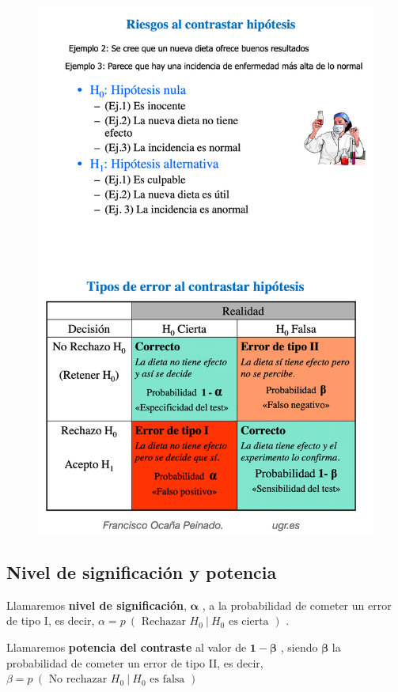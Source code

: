 \begin{figure}[H]
	\centering
	\includegraphics[width=1\textwidth]{imagenes/imagenes06/T06IM02b.png}
	\end{figure}

\subsection{Nivel de significación y potencia}

\vspace{15mm}%
\begin{definition}

Llamaremos \textbf{nivel de significación}, $\boldsymbol{\alpha}$ , a la probabilidad de cometer un error de tipo I, es decir, $\alpha= p\ (\text{ Rechazar } H_0 \ | \  H_0 \text{ es cierta } )$ .

\vspace{2mm} Llamaremos \textbf{potencia del contraste} al valor de $\boldsymbol{1 -\beta}$ , siendo $\boldsymbol{\beta}$ la probabilidad de cometer un error de tipo II, es decir, $\beta =  p\ ( \text{ No rechazar }H_0 \ | \  H_0 \text{ es falsa } )$
\end{definition}

